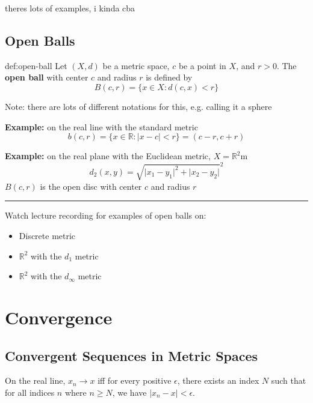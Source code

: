 \documentclass{article}
\begin{document}
theres lots of examples, i kinda cba

\newpage

\subsection{Open Balls}

\begin{dfn}{def:open-ball}{}
    Let $(X, d)$ be a metric space, $c$ be a point in $X$, and $r > 0$. The \textbf{open ball} with center $c$ and radius $r$ is defined by
    \[B(c,r) = \{x\in X: d(c,x) < r\}\]
\end{dfn}

Note: there are lots of different notations for this, e.g. calling it a sphere

\textbf{Example:} on the real line with the standard metric
\[b(c,r) = \{x\in\mathbb{R} : \lvert x - c \rvert < r\} = (c - r, c + r)\]

\textbf{Example:} on the real plane with the Euclidean metric, $X = \mathbb{R}^{2}$m
\[d_{2}(x,y) = \sqrt{\lvert x_{1} - y_{1} \rvert^{2} + \lvert x_{2} - y_{2} \rvert}^{2}\]
$B(c,r)$ is the open disc with center $c$ and radius $r$

\noindent\rule{\textwidth}{0.2pt}

Watch lecture recording for examples of open balls on:
\begin{itemize}
    \item Discrete metric
    \item $\mathbb{R}^{2}$ with the $d_{1}$ metric
    \item $\mathbb{R}^{2}$ with the $d_{\infty}$ metric
\end{itemize}

\newpage

\section{Convergence}

\subsection{Convergent Sequences in Metric Spaces}
On the real line, $x_{n}\to x$ iff for every positive $\epsilon$, there exists an index $N$ such that for all indices $n$ where $n\ge N$, we have $\lvert x_{n} - x \rvert < \epsilon$.
\end{document}

